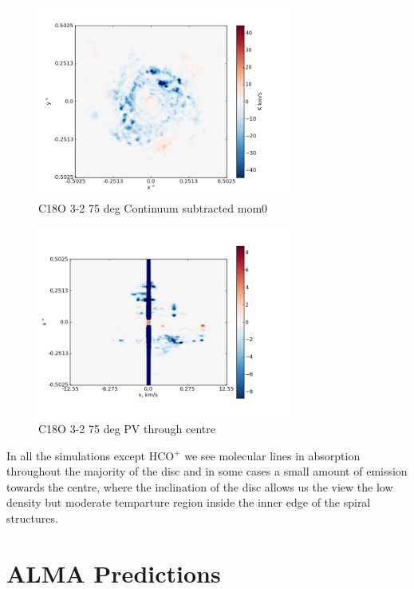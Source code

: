 \documentclass[useAMS,usenatbib]{mn2e}
\begin{document}
\begin{figure}
 \includegraphics[width=84mm]{Figures/sim/imageC18O_3-2_75deg_contSub.png}

 \caption{C18O 3-2 75 deg Continuum subtracted mom0}
\end{figure}

%

\begin{figure}
 \includegraphics[width=84mm]{Figures/sim/imageC18O_3-2_75deg_PV_centre.png}

 \caption{C18O 3-2 75 deg PV through centre}
\end{figure}


In all the simulations except HCO$^+$ we see molecular lines in absorption throughout the majority of the disc and in some cases a small amount of emission towards the centre, where the inclination of the disc allows us the view the low density but moderate temparture region inside the inner edge of the spiral structures.\newline




\section{ALMA Predictions}
\end{document}

